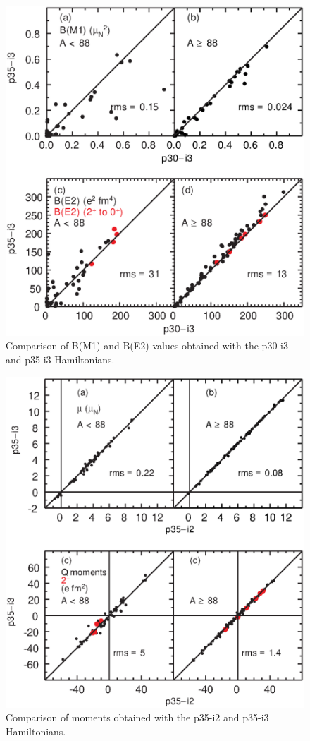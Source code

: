 \documentclass[aps,prl,twocolumn,tightenlines,superscriptaddress,showpacs]{revtex4-1}
\begin{document}
\begin{figure}
\includegraphics[scale=0.40]{bi3.eps}
\caption{Comparison of B(M1) and B(E2) values obtained with the
p30-i3 and p35-i3 Hamiltonians.
}
\label{ (2) }
\end{figure}




\begin{figure}
\includegraphics[scale=0.40]{m35.eps}
\caption{Comparison of  moments obtained with the
p35-i2 and p35-i3 Hamiltonians.
}
\label{ (3) }
\end{figure}
\end{document}
